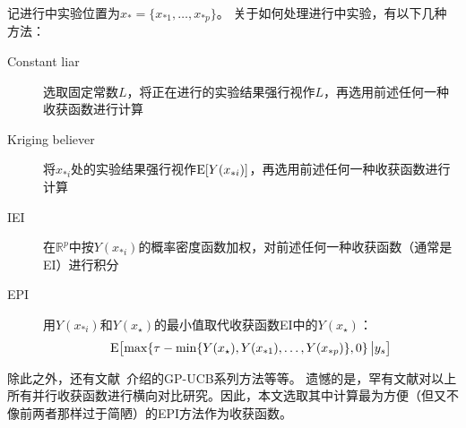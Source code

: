 \documentclass[index]{subfiles}
\begin{document}
记进行中实验位置为$x_\ast=\{x_{\ast 1},\ldots,x_{\ast p}\}$。
关于如何处理进行中实验，有以下几种方法：
\begin{description}
  \item[Constant liar] 选取固定常数$L$，将正在进行的实验结果强行视作$L$，再选用前述任何一种收获函数进行计算
  \item[Kriging believer] 将$x_{\ast i}$处的实验结果强行视作$\operatorname{E}\!\left[Y(x_{\ast i})\right]$，再选用前述任何一种收获函数进行计算
  \item[IEI] 在$\mathbb{R}^p$中按$Y(x_{\ast i})$的概率密度函数加权，对前述任何一种收获函数（通常是EI）进行积分\cite{snoek2013}
  \item[EPI] 用$Y(x_{\ast i})$和$Y(x_\star)$的最小值取代收获函数EI中的$Y(x_\star)$：\cite{clark2012}
  \begin{equation}\label{equ:bgo-epi}
    \E{\max\!\left\{\tau - \min\{Y(x_\star), Y(x_{\ast 1}),\ldots,Y(x_{\ast p})\}, 0\right\}{\big|}y_s}
  \end{equation}
\end{description}
除此之外，还有文献~介绍的GP-UCB系列方法等等。
遗憾的是，罕有文献对以上所有并行收获函数进行横向对比研究。因此，本文选取其中计算最为方便（但又不像前两者那样过于简陋）的EPI方法作为收获函数。
\end{document}
